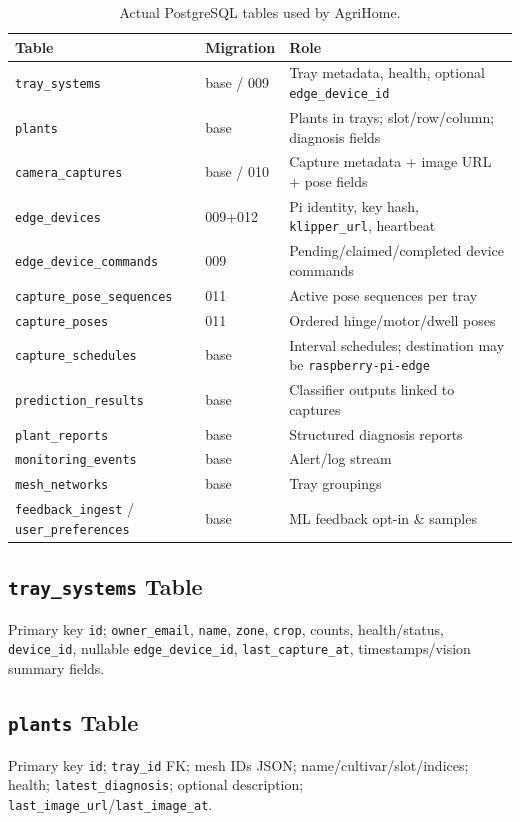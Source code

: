 \documentclass[11pt,letterpaper]{article}
\begin{document}
\begin{table}[H]
\centering
\begin{tabular}{@{}llp{7.2cm}@{}}
\toprule
\textbf{Table} & \textbf{Migration} & \textbf{Role} \\
\midrule
\texttt{tray\_systems} & base / 009 & Tray metadata, health, optional \texttt{edge\_device\_id} \\
\texttt{plants} & base & Plants in trays; slot/row/column; diagnosis fields \\
\texttt{camera\_captures} & base / 010 & Capture metadata + image URL + pose fields \\
\texttt{edge\_devices} & 009+012 & Pi identity, key hash, \texttt{klipper\_url}, heartbeat \\
\texttt{edge\_device\_commands} & 009 & Pending/claimed/completed device commands \\
\texttt{capture\_pose\_sequences} & 011 & Active pose sequences per tray \\
\texttt{capture\_poses} & 011 & Ordered hinge/motor/dwell poses \\
\texttt{capture\_schedules} & base & Interval schedules; destination may be
  \texttt{raspberry-pi-edge} \\
\texttt{prediction\_results} & base & Classifier outputs linked to captures \\
\texttt{plant\_reports} & base & Structured diagnosis reports \\
\texttt{monitoring\_events} & base & Alert/log stream \\
\texttt{mesh\_networks} & base & Tray groupings \\
\texttt{feedback\_ingest} / \texttt{user\_preferences} & base & ML feedback opt-in \& samples \\
\bottomrule
\end{tabular}
\caption{Actual PostgreSQL tables used by AgriHome.}
\label{tab:schema-summary}
\end{table}

\subsection{\texttt{tray\_systems} Table}
Primary key \texttt{id}; \texttt{owner\_email}, \texttt{name}, \texttt{zone}, \texttt{crop},
counts, health/status, \texttt{device\_id}, nullable \texttt{edge\_device\_id},
\texttt{last\_capture\_at}, timestamps/vision summary fields.

\subsection{\texttt{plants} Table}
Primary key \texttt{id}; \texttt{tray\_id} FK; mesh IDs JSON; name/cultivar/slot/indices;
health; \texttt{latest\_diagnosis}; optional description;
\texttt{last\_image\_url}/\texttt{last\_image\_at}.
\end{document}
